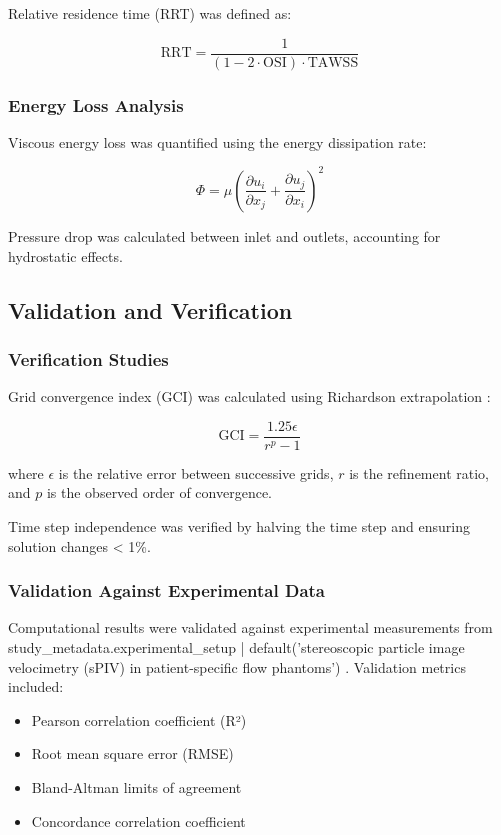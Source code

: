 Relative residence time (RRT) was defined as:

\begin{equation}
\text{RRT} = \frac{1}{(1 - 2 \cdot \text{OSI}) \cdot \text{TAWSS}}
\end{equation}

\subsubsection{Energy Loss Analysis}
Viscous energy loss was quantified using the energy dissipation rate:

\begin{equation}
\Phi = \mu \left(\frac{\partial u_i}{\partial x_j} + \frac{\partial u_j}{\partial x_i}\right)^2
\end{equation}

Pressure drop was calculated between inlet and outlets, accounting for hydrostatic effects.

\subsection{Validation and Verification}

\subsubsection{Verification Studies}
Grid convergence index (GCI) was calculated using Richardson extrapolation \cite{ref_gci}:

\begin{equation}
\text{GCI} = \frac{1.25 \epsilon}{r^p - 1}
\end{equation}

where $\epsilon$ is the relative error between successive grids, $r$ is the refinement ratio, and $p$ is the observed order of convergence.

Time step independence was verified by halving the time step and ensuring solution changes < 1\%.

\subsubsection{Validation Against Experimental Data}
Computational results were validated against experimental measurements from {{ study_metadata.experimental_setup | default('stereoscopic particle image velocimetry (sPIV) in patient-specific flow phantoms') }}. Validation metrics included:

\begin{itemize}
    \item Pearson correlation coefficient (R²)
    \item Root mean square error (RMSE)
    \item Bland-Altman limits of agreement
    \item Concordance correlation coefficient
\end{itemize}

